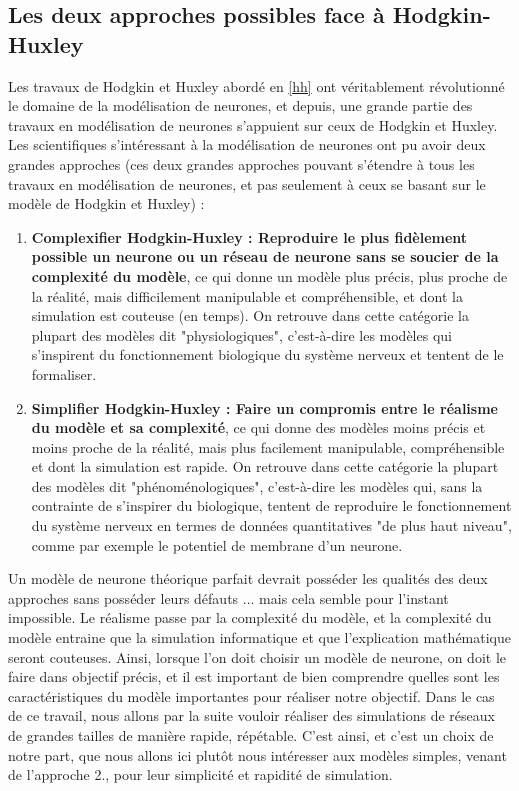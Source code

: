 \documentclass[12pt]{scrartcl}
\begin{document}
\subsection{Les deux approches possibles face à Hodgkin-Huxley}
Les travaux de Hodgkin et Huxley abordé en \ref{hh} ont véritablement révolutionné le domaine de la modélisation de neurones, et depuis, une grande partie des travaux en modélisation de neurones s'appuient sur ceux de Hodgkin et Huxley. Les scientifiques s'intéressant à la modélisation de neurones ont pu avoir deux grandes approches (ces deux grandes approches pouvant s'étendre à tous les travaux en modélisation de neurones, et pas seulement à ceux se basant sur le modèle de Hodgkin et Huxley) : 
\begin{enumerate} \item \textbf{Complexifier Hodgkin-Huxley : Reproduire le plus fidèlement possible un neurone ou un réseau de neurone sans se soucier de la complexité du modèle}, ce qui donne un modèle plus précis, plus proche de la réalité, mais difficilement manipulable et compréhensible, et dont la simulation est couteuse (en temps). On retrouve dans cette catégorie la plupart des modèles dit "physiologiques", c'est-à-dire les modèles qui s'inspirent du fonctionnement biologique du système nerveux et tentent de le formaliser. 
\item \textbf{Simplifier Hodgkin-Huxley : Faire un compromis entre le réalisme du modèle et sa complexité}, ce qui donne des modèles moins précis et moins proche de la réalité, mais plus facilement manipulable, compréhensible et dont la simulation est rapide. On retrouve dans cette catégorie la plupart des modèles dit "phénoménologiques", c'est-à-dire les modèles qui, sans la contrainte de s'inspirer du biologique, tentent de reproduire le fonctionnement du système nerveux en termes de données quantitatives "de plus haut niveau", comme par exemple le potentiel de membrane d'un neurone. \end{enumerate}
Un modèle de neurone théorique parfait devrait posséder les qualités des deux approches sans posséder leurs défauts ... mais cela semble pour l'instant impossible. Le réalisme passe par la complexité du modèle, et la complexité du modèle entraine que la simulation informatique et que l'explication mathématique seront couteuses. Ainsi, lorsque l'on doit choisir un modèle de neurone, on doit le faire dans objectif précis, et il est important de bien comprendre quelles sont les caractéristiques du modèle importantes pour réaliser notre objectif. Dans le cas de ce travail, nous allons par la suite vouloir réaliser des simulations de réseaux de grandes tailles de manière rapide, répétable. C'est ainsi, et c'est un choix de notre part, que nous allons ici plutôt nous intéresser aux modèles simples, venant de l'approche 2., pour leur simplicité et rapidité de simulation. 
\end{document}
